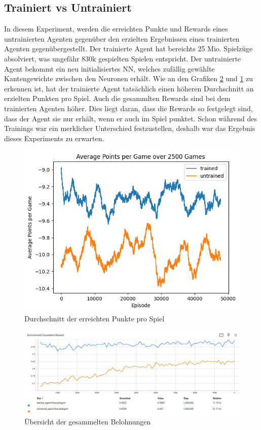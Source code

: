 \subsection{Trainiert vs Untrainiert}
In diesem Experiment, werden die erreichten Punkte und Rewards eines untrainierten Agenten gegenüber den erzielten Ergebnissen eines trainierten Agenten gegenübergestellt. Der trainierte Agent hat bereichts 25 Mio. Spielzüge absolviert, was ungefähr 830k gespielten Spielen entspricht.
Der untrainierte Agent bekommt ein neu initialisiertes NN, welches zufällig gewählte Kantengewichte zwischen den Neuronen erhält.
Wie an den Grafiken \ref{fig:untrained_rewards} und \ref{fig:untrained_points} zu erkennen ist, hat der trainierte Agent tatsächlich einen höheren Durchschnitt an erzielten Punkten pro Spiel. Auch die gesammlten Rewards sind bei dem trainierten Agenten höher.
Dies liegt daran, dass die Rewards so festgelegt sind, dass der Agent sie nur erhält, wenn er auch im Spiel punktet.
Schon während des Trainings war ein merklicher Unterschied festzustellen, deshalb war das Ergebnis dieses Experiments zu erwarten.


\begin{figure}[!h]
    \centering
    \includegraphics[scale=0.6]{Bilder/points_trained_vs_untrained.png}
    \caption{Durchschnitt der erreichten Punkte pro Spiel }
    \label{fig:untrained_points}
\end{figure}
\begin{figure}[!h]
    \centering
    \includegraphics[scale=0.3]{Bilder/rewards_untrained.png}
    \caption{Übersicht der gesammelten Belohnungen}
    \label{fig:untrained_rewards}
\end{figure}

